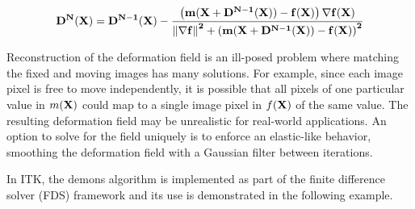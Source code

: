 \begin{equation}
\bf{D}^{N}(\bf{X}) = \bf{D}^{N-1}(\bf{X}) - \frac
{\left(  m(\bf{X}+ \bf{D}^{N-1}(\bf{X})) 
- f(\bf{X}) \right) \nabla f(\bf{X})}
{\left\|  \nabla f \right\|^2 + \left(  
m(\bf{X}+ \bf{D}^{N-1}(\bf{X}) )
 - f(\bf{X}) \right)^2 } 
\label{eqn:DemonsUpdateEquation}
\end{equation}

Reconstruction of the deformation field is an ill-posed problem where
matching the fixed and moving images has many solutions. For example, since
each image pixel is free to move independently, it is possible that all
pixels of one particular value in $m(\bf{X})$ could map to a single image
pixel in $f(\bf{X})$ of the same value. The resulting deformation field may
be unrealistic for real-world applications. An option to solve for the field
uniquely is to enforce an elastic-like behavior, smoothing the deformation
field with a Gaussian filter between iterations.

In ITK, the demons algorithm is implemented as part of the finite difference
solver (FDS) framework and its use is demonstrated in the following example.

 


